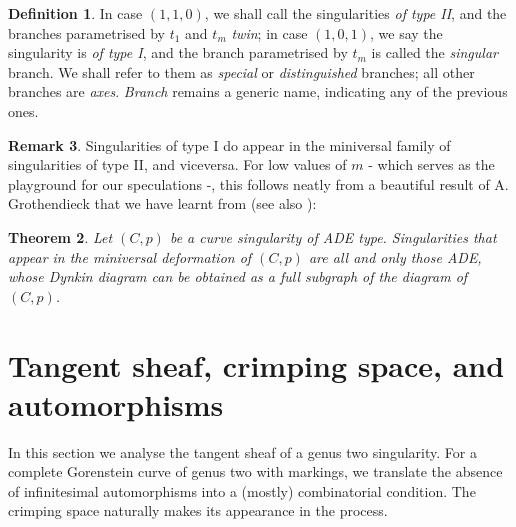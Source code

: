 \documentclass[11pt]{amsart}
\theoremstyle{plain}
\newtheorem{thm}{Theorem}[section]
\theoremstyle{definition}
\newtheorem{dfn}[thm]{Definition}
\newtheorem{rem}[thm]{Remark}
\begin{document}

\begin{dfn}\label{def:special_branches}
 In case $(1,1,0)$, we shall call the singularities \emph{of type II}, and the branches parametrised by $t_1$ and $t_m$ \emph{twin}; in case $(1,0,1)$, we say the singularity is \emph{of type I}, and the branch parametrised by $t_m$ is called the \emph{singular} branch. We shall refer to them as \emph{special} or \emph{distinguished} branches; all other branches are \emph{axes}. \emph{Branch} remains a generic name, indicating any of the previous ones.
\end{dfn}

\begin{rem}
 Singularities of type I do appear in the miniversal family of singularities of type II, and viceversa. For low values of $m$ - which serves as the playground for our speculations -, this follows neatly from a beautiful result of A. Grothendieck that we have learnt from \cite{C-ML} (see also \cite{Arnold,Demazure}):
 \begin{thm}\label{thm:ADE}
  Let $(C,p)$ be a curve singularity of ADE type. Singularities that appear in the miniversal deformation of $(C,p)$ are all and only those ADE, whose Dynkin diagram can be obtained as a full subgraph of the diagram of $(C,p)$.
 \end{thm}
\end{rem}


\section{Tangent sheaf, crimping space, and automorphisms}
In this section we analyse the tangent sheaf of a genus two singularity. For a complete Gorenstein curve of genus two with markings, we translate the absence of infinitesimal automorphisms into a (mostly) combinatorial condition. The crimping space naturally makes its appearance in the process.
\end{document}
